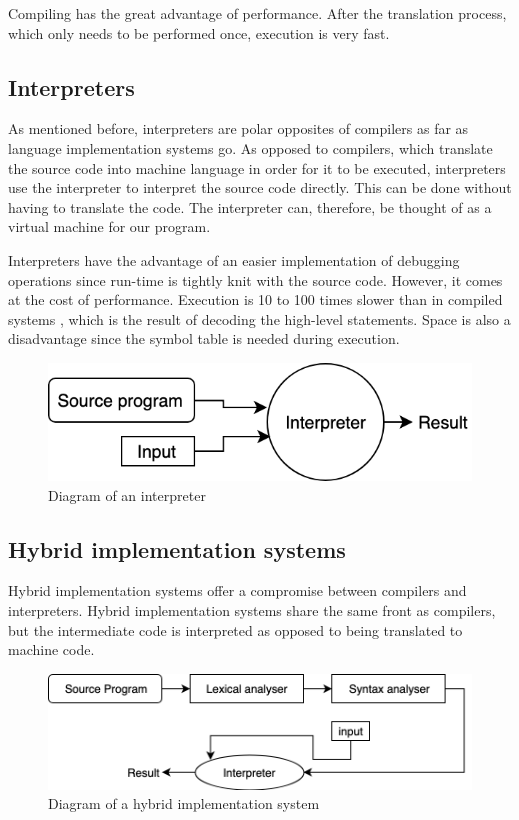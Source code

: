 Compiling has the great advantage of performance. After the translation process, which only needs to be performed once, execution is very fast.

\subsection{Interpreters}\label{Evaluator:Interpreters}

As mentioned before, interpreters are polar opposites of compilers as far as language implementation systems go. As opposed to compilers, which translate the source code into machine language in order for it to be executed, interpreters use the interpreter to interpret the source code directly. This can be done without having to translate the code. The interpreter can, therefore, be thought of as a virtual machine for our program.

\par
Interpreters have the advantage of an easier implementation of debugging operations since run-time is tightly knit with the source code. However, it comes at the cost of performance. Execution is 10 to 100 times slower than in compiled systems \cite[p. 50]{concepts-of-programming-languages}, which is the result of decoding the high-level statements. Space is also a disadvantage since the symbol table is needed during execution.

\begin{figure}[!ht]
  \centering
  \includegraphics[scale=0.3]{Pictures/interpreter-diagram.png}
  \caption{Diagram of an interpreter}
  \label{fig:interpreterdiag}
\end{figure}

\subsection{Hybrid implementation systems}\label{Evaluator:Hybrid}
Hybrid implementation systems offer a compromise between compilers and interpreters. Hybrid implementation systems share the same front as compilers, but the intermediate code is interpreted as opposed to being translated to machine code. 

\begin{figure}[!ht]
  \centering
  \includegraphics[scale=0.3]{Pictures/hybrid-diagram.png}
  \caption{Diagram of a hybrid implementation system}
  \label{fig:hybriddiag}
\end{figure}

